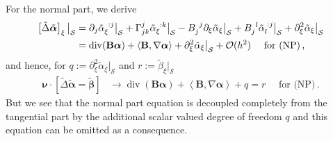 \documentclass[a4paper,10pt]{scrartcl}
\newcommand{\surf}{\mathcal{S}}
\newcommand{\landau}{\mathcal{O}}
\newcommand{\nub}{\bm{\nu}}
\newcommand{\Bb}{\mathbf{B}}
\newcommand{\alphab}{\bm{\alpha}}
\newcommand{\betab}{\bm{\beta}}
\renewcommand{\div}{\operatorname{div}}
\newcommand{\talphab}{\tilde{\alphab}}
\newcommand{\talpha}{\tilde{\alpha}}
\newcommand{\tbetab}{\tilde{\betab}}
\newcommand{\tbeta}{\tilde{\beta}}
\newcommand{\tlaplace}{\tilde{\Delta}}
\newcommand{\ch}[2]{\Gamma_{#1}^{#2}}
\newcommand{\formComma}{\,\text{,}}
\newcommand{\formPeriod}{\,\text{.}}
\begin{document}
      For the normal part, we derive
      \begin{align}
        \left[ \tlaplace\talphab \right]_{\xi}\big|_{\surf}
            &= \partial_{j}\tensor{\talpha}{_{\xi}^{:j}}\big|_{\surf} + \ch{jk}{j}\tensor{\talpha}{_{\xi}^{:k}}\big|_{\surf}
              - \tensor{B}{_{j}^{j}}\partial_{\xi}\talpha_{\xi}\big|_{\surf}
              +  \tensor{B}{_{j}^{l}}\tensor{\talpha}{_{l}^{:j}}\big|_{\surf} + \partial_{\xi}^{2}\talpha_{\xi}\big|_{\surf}\\
            &= \div(\Bb\alphab) + \left\langle \Bb,\nabla\alphab \right\rangle + \partial_{\xi}^{2}\talpha_{\xi}\big|_{\surf} + \landau(h^{2})
              \quad\text{ for (NP)}\formComma
      \end{align}
      and hence, for \( q:=\partial_{\xi}^{2}\talpha_{\xi}\big|_{\surf} \) and \( r:= \tbeta_{\xi}\big|_{\surf} \)
      \begin{align}
        \nub\cdot\left[\tlaplace\talphab = \tbetab  \right] &\longrightarrow
               \div(\Bb\alphab) + \left\langle \Bb,\nabla\alphab \right\rangle + q
                  =  r  \quad\text{ for (NP)}\formPeriod
      \end{align}
      But we see that the normal part equation is decoupled completely from the tangential part by the additional scalar valued degree of freedom \( q \)
      and this equation can be omitted as a consequence.
\end{document}
